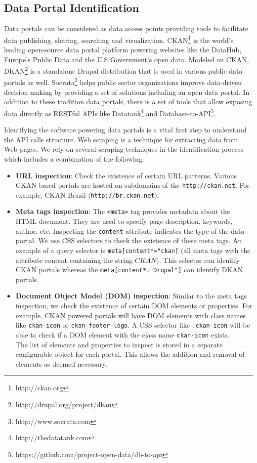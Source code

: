 \documentclass[runningheads,a4paper]{llncs}
\begin{document}
\subsection{Data Portal Identification}

Data portals can be considered as data access points providing tools to facilitate data publishing, sharing, searching and visualization. CKAN\footnote{http://ckan.org} is the world's leading open-source data portal platform powering websites like the DataHub, Europe's Public Data and the U.S Government's open data. Modeled on CKAN, DKAN\footnote{http://drupal.org/project/dkan} is a standalone Drupal distribution that is used in various public data portals as well. Socrata\footnote{http://www.socrata.com} helps public sector organizations improve data-driven decision making by providing a set of solutions including an open data portal. In addition to these tradition data portals, there is a set of tools that allow exposing data directly as RESTful APIs like Datatank\footnote{http://thedatatank.com} and Database-to-API\footnote{https://github.com/project-open-data/db-to-api}.

Identifying the software powering data portals is a vital first step to understand the API calls structure. Web scraping is a technique for extracting data from Web pages. We rely on several scraping techniques in the identification process which includes a combination of the following:

\begin{itemize}
  \item \textbf{URL inspection}: Check the existence of certain URL patterns. Various CKAN based portals are hosted on subdomains of the \texttt{http://ckan.net}. For example, CKAN Brazil (\texttt{http://br.ckan.net}).
  \item \textbf{Meta tags inspection}: The \texttt{<meta>} tag provides metadata about the HTML document. They are used to specify page description, keywords, author, etc. Inspecting the \texttt{content} attribute indicates the type of the data portal. We use CSS selectors to check the existence of these meta tags. An example of a query selector is \texttt{meta[content*="ckan]} (all meta tags with the attribute content containing the string $CKAN$). This selector can identify CKAN portals whereas the \texttt{meta[content*="Drupal"]} can identify DKAN portals.
  \item \textbf{Document Object Model (DOM) inspection}: Similar to the meta tags inspection, we check the existence of certain DOM elements or properties. For example, CKAN powered portals will have DOM elements with class names like \texttt{ckan-icon} or \texttt{ckan-footer-logo}. A CSS selector like \texttt{.ckan-icon} will be able to check if a DOM element with the class name \texttt{ckan-icon} exists.\\
  The list of elements and properties to inspect is stored in a separate configurable object for each portal. This allows the addition and removal of elements as deemed necessary.
\end{itemize}
\end{document}
